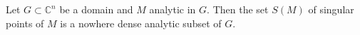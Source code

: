 Let $G \subset \mathbb{C}^n$ be a domain and $M$ analytic in $G$. Then the set $S(M)$ of singular points of $M$ is a nowhere dense analytic subset of $G$.
